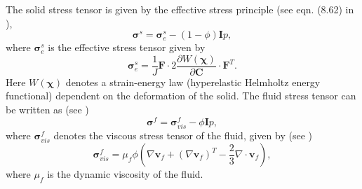 The solid stress tensor is given by the effective stress principle (see eqn. (8.62) in \citet{boer2005trends}),
\begin{equation}
\boldsymbol\sigma^{s} =\boldsymbol\sigma^{s}_{e} - (1-\phi)\boldsymbol{I}p,
\end{equation}
where $\boldsymbol\sigma^{s}_{e}$ is the effective stress tensor given by
\begin{equation}
\boldsymbol\sigma^{s}_{e}=\frac{1}{J}\boldsymbol{F}\cdot 2 \frac{\partial W(\boldsymbol\chi)}{\partial \boldsymbol{C}}  \cdot \boldsymbol{F}^{T}.
\label{eqn:sigma_e}
\end{equation}
Here $W(\boldsymbol{\chi})$ denotes a strain-energy law (hyperelastic Helmholtz energy functional) dependent on the deformation of the solid. The fluid stress tensor can be written as (see \citet[eqn. (8.63)]{boer2005trends})
\begin{equation}
\boldsymbol\sigma^{f} =\boldsymbol\sigma^{f}_{vis} - \phi\boldsymbol{I}p,
\label{eqn:sigma_vis}
\end{equation}
where $\boldsymbol\sigma^{f}_{vis}$ denotes the viscous stress tensor of the fluid, given by  (see \citet[eqn. (6.145)]{boer2005trends})
\begin{equation}
\boldsymbol\sigma^{f}_{vis}= \mu_{f} \phi ( \nabla \boldsymbol{v}_f + (\nabla \boldsymbol{v}_f)^{T} - \frac{2}{3}\nabla \cdot\boldsymbol{v}_f),
\label{eqn:viscous_stress}
\end{equation}
where $\mu_{f}$ is the dynamic viscosity of the fluid. \newline


